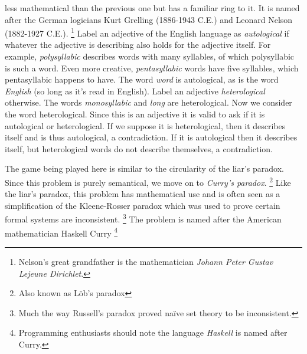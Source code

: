         less mathematical than the previous one but has a familiar ring to it.
        It is named after the German logicians Kurt
        Grelling (1886-1943 C.E.) and Leonard
        Nelson (1882-1927 C.E.).%
        \footnote{%
            Nelson's great grandfather is the mathematician
            \textit{Johann Peter Gustav Lejeune Dirichlet}.%
        }
        Label an adjective of the English language as \textit{autological} if
        whatever the adjective is describing also holds for the adjective
        itself. For example, \textit{polysyllabic} describes words with many
        syllables, of which polysyllabic is such a word. Even more creative,
        \textit{pentasyllabic} words have five syllables, which pentasyllabic
        happens to have. The word \textit{word} is autological, as is the word
        \textit{English} (so long as it's read in English). Label an adjective
        \textit{heterological} otherwise. The words \textit{monosyllabic} and
        \textit{long} are heterological. Now we consider the word heterological.
        Since this is an adjective it is valid to ask if it is autological or
        heterological. If we suppose it is heterological, then it describes
        itself and is thus autological, a contradiction. If it is autological
        then it describes itself, but heterological words do not describe
        themselves, a contradiction.
        \par\hfill\par
        The game  being played here is similar to the circularity of the
        liar's paradox. Since this problem is purely semantical, we move on to
        \textit{Curry's paradox}.%
        \footnote{%
            Also known as L\"{o}b's paradox%
        }
        Like the liar's paradox, this problem has mathematical use and is often
        seen as a simplification of the Kleene-Rosser paradox%
         which was
        used to prove certain formal systems are inconsistent.%
        \footnote{%
            Much the way Russell's paradox proved na\"{i}ve set theory to
            be inconsistent.
        }
        The problem is named after the American mathematician
        Haskell Curry%
        \footnote{%
            Programming enthusiasts should note the language
            \textit{Haskell} is named after Curry.
        }
